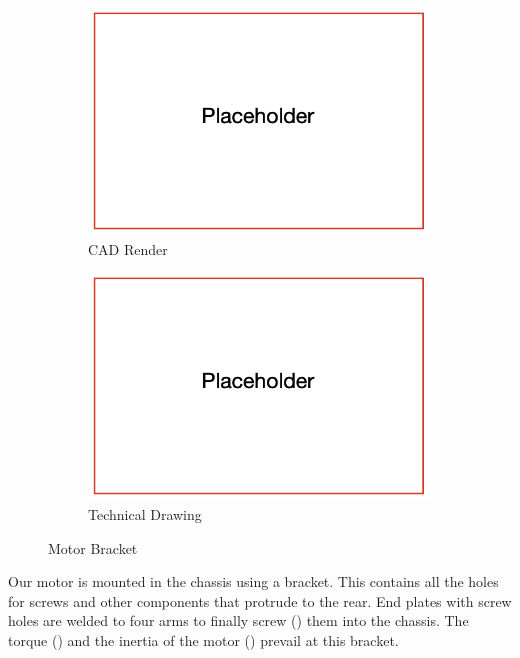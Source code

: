 \begin{figure}[ht!]
  \centering
  \begin{subfigure}{.5\textwidth}
    \centering
    \includegraphics[width=\linewidth]{texfiles/mech/eimg/propulsion/placeholder}
    \caption{CAD Render}
    \label{fig:CAD Motorbracket}
  \end{subfigure}%
  \begin{subfigure}{.5\textwidth}
    \centering
    \includegraphics[width=\linewidth]{texfiles/mech/eimg/propulsion/placeholder}
    \caption{Technical Drawing}
    \label{fig:TD Motorbracket}
  \end{subfigure}
  \caption{Motor Bracket}
  \label{fig:Motorbracket}
\end{figure}

Our motor is mounted in the chassis using a bracket. This contains all the holes for screws and other components that protrude to the rear. End plates with screw holes are welded to four arms to finally screw () them into the chassis. The torque () and the inertia of the motor () prevail at this bracket.

